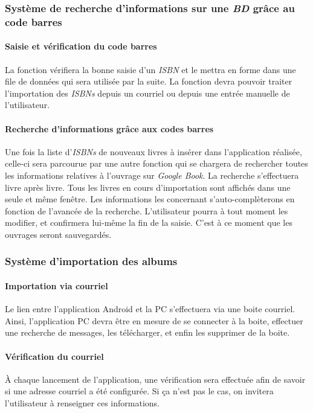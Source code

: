 \subsubsection{Système de recherche d'informations sur une \emph{BD} grâce au code barres}

\paragraph{Saisie et vérification du code barres}
La fonction vérifiera la bonne saisie d'un \emph{ISBN} et le mettra en forme dans une file de données qui sera utilisée par la suite. 
La fonction devra pouvoir traiter l'importation des \emph{ISBNs} depuis un courriel ou depuis une entrée manuelle de l'utilisateur. 

\paragraph{Recherche d'informations grâce aux codes barres}
Une fois la liste d'\emph{ISBNs} de nouveaux livres à insérer dans l'application réalisée, 
	 celle-ci sera parcourue par une autre fonction qui se chargera de rechercher toutes les informations relatives à l'ouvrage sur \emph{Google Book}. 
La recherche s'effectuera livre après livre. 
Tous les livres en cours d'importation sont affichés dans une seule et même fenêtre. 
Les informations les concernant s'auto-complèterons en fonction de l'avancée de la recherche.
L'utilisateur pourra à tout moment les modifier, et confirmera lui-même la fin de la saisie. C'est à ce moment que les ouvrages seront sauvegardés.

\subsubsection{Système d'importation des albums}

\paragraph{Importation via courriel} 
Le lien entre l'application Android et la PC s'effectuera via une boite courriel. 
Ainsi, l'application PC devra être en mesure de se connecter à la boite, effectuer une recherche de messages, 
	les télécharger, et enfin les supprimer de la boite. 

\paragraph{Vérification du courriel}
À chaque lancement de l'application, une vérification sera effectuée afin de savoir si une adresse courriel a été configurée. 
Si ça n'est pas le cas, on invitera l'utilisateur à renseigner ces informations. 

